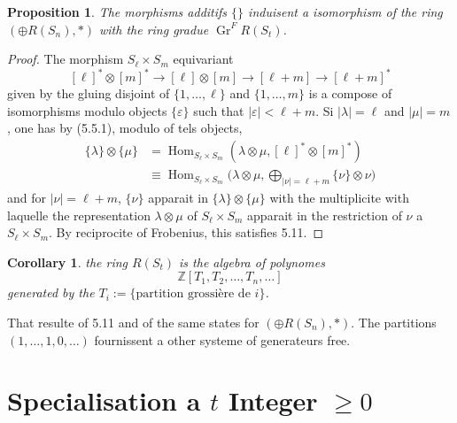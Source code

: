 \documentclass[11pt,a4paper]{article}
\theoremstyle{plain}
\newtheorem{proposition}[theorem]{Proposition}
\newtheorem{corollary}[theorem]{Corollary}
\theoremstyle{definition}
\DeclareMathOperator{\Hom}{Hom}
\newcommand{\Z}{\mathbb{Z}}
\newcommand{\eps}{\varepsilon}
\DeclareMathOperator{\Gr}{Gr}
\begin{document}
\begin{proposition}
The morphisms additifs $\{\}$ induisent a isomorphism of the ring $(\oplus R(S_n), \ast)$ with the ring gradue $\Gr^F R(S_t)$.
\end{proposition}

\begin{proof}
The morphism $S_\ell \times S_m$ equivariant
\[
[\ell]^* \otimes [m]^* \to [\ell] \otimes [m] \to [\ell+m] \to [\ell+m]^*
\]
given by the gluing disjoint of $\{1, \ldots, \ell\}$ and $\{1, \ldots, m\}$ is a compose of isomorphisms modulo objects $\{\eps\}$ such that $|\eps| < \ell+m$. Si $|\lambda| = \ell$ and $|\mu| = m$, one has by (5.5.1), modulo of tels objects,
\begin{align*}
\{\lambda\} \otimes \{\mu\} &= \Hom_{S_\ell \times S_m}(\lambda \otimes \mu, [\ell]^* \otimes [m]^*) \\
&\equiv \Hom_{S_\ell \times S_m}\bigl(\lambda \otimes \mu, \bigoplus_{|\nu| = \ell+m} \{\nu\} \otimes \nu\bigr)
\end{align*}
and for $|\nu| = \ell+m$, $\{\nu\}$ apparait in $\{\lambda\} \otimes \{\mu\}$ with the multiplicite with laquelle the representation $\lambda \otimes \mu$ of $S_\ell \times S_m$ apparait in the restriction of $\nu$ a $S_\ell \times S_m$. By reciprocite of Frobenius, this satisfies 5.11.
\end{proof}

\begin{corollary}
the ring $R(S_t)$ is the algebra of polynomes
\[
\Z[T_1, T_2, \ldots, T_n, \ldots]
\]
generated by the $T_i := \{\text{partition grossi\`ere de } i\}$.
\end{corollary}

That resulte of 5.11 and of the same states for $(\oplus R(S_n), \ast)$. The partitions $(1, \ldots, 1, 0, \ldots)$ fournissent a other systeme of generateurs free.


\section{Specialisation a $t$ Integer $\geq 0$}
\end{document}
